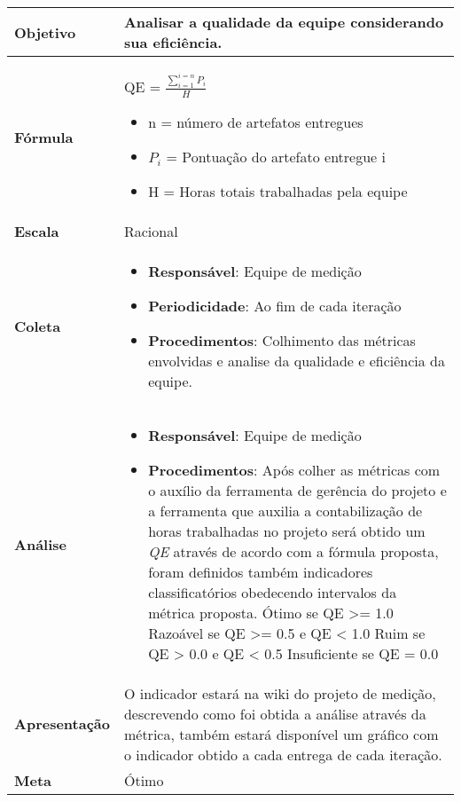 	\begin{tabular}{ |p{3cm}|p{12cm}| }
		\hline
		\textbf{Objetivo} & Analisar a qualidade da equipe considerando sua eficiência. \\
		\hline
		\textbf{Fórmula} & QE = $\frac{\sum_{i=1}^{i=n}P_i}{H}$ \begin{itemize}
  		\item n = número de artefatos entregues 
	  	\item $P_i$ = Pontuação do artefato entregue i
		\item H = Horas totais trabalhadas pela equipe
		\end{itemize}\\
		\hline
		\textbf{Escala} & Racional \\
		\hline
    	\textbf{Coleta} & \begin{itemize}
		 \item \textbf{Responsável}: Equipe de medição
    	 \item \textbf{Periodicidade}: Ao fim de cada iteração
                                                                                                                                \item \textbf{Procedimentos}: Colhimento das métricas envolvidas e analise da qualidade e eficiência da equipe.
		\end{itemize} \\
		\hline
		\textbf{Análise} & \begin{itemize}
			\item \textbf{Responsável}: Equipe de medição
			\item \textbf{Procedimentos}: Após colher as métricas com o auxílio da ferramenta de gerência do projeto e a ferramenta que auxilia a contabilização de horas trabalhadas no projeto será obtido um \textit{QE} através de acordo com a fórmula proposta, foram definidos também indicadores classificatórios obedecendo intervalos da métrica proposta.
				\subitem Ótimo se QE >= 1.0
				\subitem Razoável se QE >= 0.5 e QE < 1.0
				\subitem Ruim se QE > 0.0 e QE < 0.5
				\subitem Insuficiente se QE = 0.0
		\end{itemize} \\
		\hline
		\textbf{Apresentação} & O indicador estará na wiki do projeto de medição, descrevendo como foi obtida a análise através da métrica, também estará disponível um gráfico com o indicador obtido a cada entrega de cada iteração. \\
		\hline
		\textbf{Meta} & Ótimo \\
		\hline
	\end{tabular}

